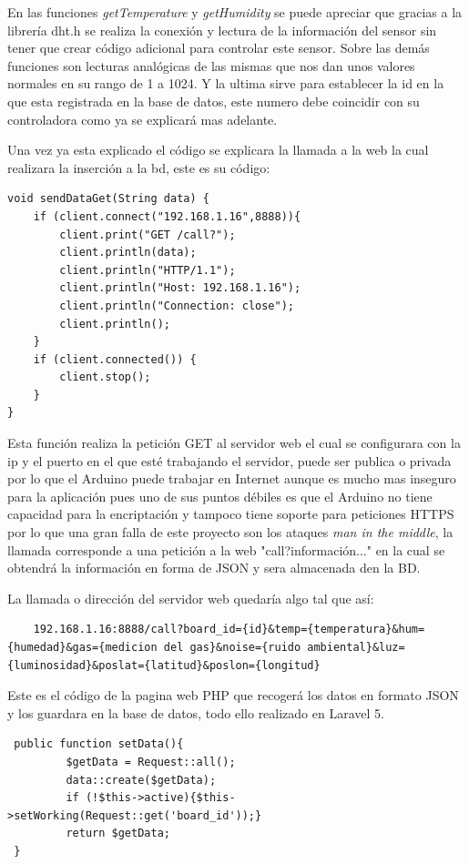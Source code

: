 En las funciones \textit{getTemperature} y \textit{getHumidity} se puede apreciar que gracias a la librería dht.h se realiza la conexión y lectura de la información del sensor sin tener que crear código adicional para controlar este sensor. Sobre las demás funciones son lecturas analógicas de las mismas que nos dan unos valores normales en su rango de 1 a 1024. Y la ultima sirve para establecer la id en la que esta registrada en la base de datos, este numero debe coincidir con su controladora como ya se explicará mas adelante.

Una vez ya esta explicado el código se explicara la llamada a la web la cual realizara la inserción a la bd, este es su código:

\begin{lstlisting}
void sendDataGet(String data) {
	if (client.connect("192.168.1.16",8888)){
		client.print("GET /call?");
		client.println(data);
		client.println("HTTP/1.1");
		client.println("Host: 192.168.1.16");        
		client.println("Connection: close");
		client.println();
	}
	if (client.connected()) { 
		client.stop();
	}
}
\end{lstlisting}

Esta función realiza la petición GET al servidor web el cual se configurara con la ip y el puerto en el que esté trabajando el servidor, puede ser publica o privada por lo que el Arduino puede trabajar en Internet aunque es mucho mas inseguro para la aplicación pues uno de sus puntos débiles es que el Arduino no tiene capacidad para la encriptación y tampoco tiene soporte para peticiones HTTPS por lo que una gran falla de este proyecto son los ataques \textit{man in the middle}, la llamada corresponde a una petición a la web "call?información..." en la cual se obtendrá la información en forma de JSON y sera almacenada den la BD.

La llamada o dirección del servidor web quedaría algo tal que así: 

\begin{lstlisting}
	192.168.1.16:8888/call?board_id={id}&temp={temperatura}&hum={humedad}&gas={medicion del gas}&noise={ruido ambiental}&luz={luminosidad}&poslat={latitud}&poslon={longitud}
\end{lstlisting}

Este es el código de la pagina web PHP que recogerá los datos en formato JSON y los guardara en la base de datos, todo ello realizado en Laravel 5.

\begin{lstlisting}
 public function setData(){
		 $getData = Request::all();
		 data::create($getData);
		 if (!$this->active){$this->setWorking(Request::get('board_id'));}
		 return $getData;
 }
\end{lstlisting}

